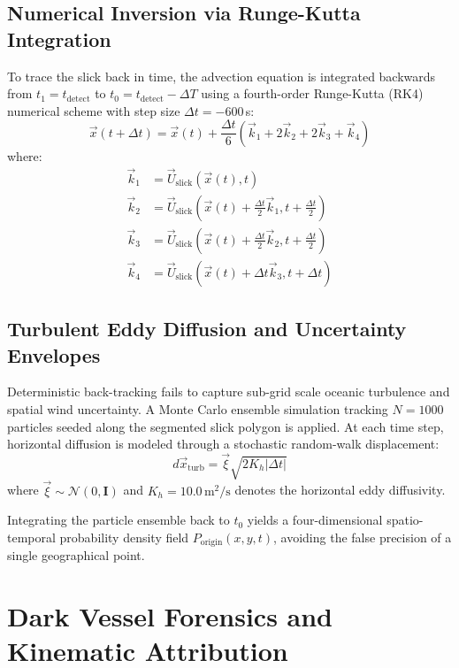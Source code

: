 \documentclass[conference]{IEEEtran}
\begin{document}
\subsection{Numerical Inversion via Runge-Kutta Integration}
To trace the slick back in time, the advection equation is integrated backwards from $t_1 = t_{\text{detect}}$ to $t_0 = t_{\text{detect}} - \Delta T$ using a fourth-order Runge-Kutta (RK4) numerical scheme with step size $\Delta t = -600$\,s:
\begin{equation}
\vec{x}(t + \Delta t) = \vec{x}(t) + \frac{\Delta t}{6} \left(\vec{k}_1 + 2\vec{k}_2 + 2\vec{k}_3 + \vec{k}_4\right)
\label{eq:rk4_integration}
\end{equation}
where:
\begin{align}
\vec{k}_1 &= \vec{U}_{\text{slick}}(\vec{x}(t), t) \\
\vec{k}_2 &= \vec{U}_{\text{slick}}\left(\vec{x}(t) + \frac{\Delta t}{2}\vec{k}_1, t + \frac{\Delta t}{2}\right) \\
\vec{k}_3 &= \vec{U}_{\text{slick}}\left(\vec{x}(t) + \frac{\Delta t}{2}\vec{k}_2, t + \frac{\Delta t}{2}\right) \\
\vec{k}_4 &= \vec{U}_{\text{slick}}\left(\vec{x}(t) + \Delta t \vec{k}_3, t + \Delta t\right)
\end{align}

\subsection{Turbulent Eddy Diffusion and Uncertainty Envelopes}
Deterministic back-tracking fails to capture sub-grid scale oceanic turbulence and spatial wind uncertainty. A Monte Carlo ensemble simulation tracking $N = 1000$ particles seeded along the segmented slick polygon is applied. At each time step, horizontal diffusion is modeled through a stochastic random-walk displacement:
\begin{equation}
d\vec{x}_{\text{turb}} = \vec{\xi} \sqrt{2 K_h |\Delta t|}
\label{eq:turbulent_diffusion}
\end{equation}
where $\vec{\xi} \sim \mathcal{N}(0, \mathbf{I})$ and $K_h = 10.0$\,$\text{m}^2/\text{s}$ denotes the horizontal eddy diffusivity. 

Integrating the particle ensemble back to $t_0$ yields a four-dimensional spatio-temporal probability density field $P_{\text{origin}}(x, y, t)$, avoiding the false precision of a single geographical point.

\section{Dark Vessel Forensics and Kinematic Attribution}
\end{document}
